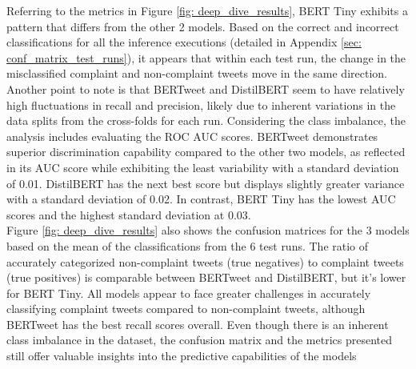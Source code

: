 Referring to the metrics in Figure \ref{fig: deep_dive_results}, BERT Tiny exhibits a pattern that differs from the other 2 models. Based on the correct and incorrect classifications for all the inference executions (detailed in Appendix \ref{sec: conf_matrix_test_runs}), it appears that within each test run, the change in the misclassified complaint and non-complaint tweets move in the same direction. Another point to note is that BERTweet and DistilBERT seem to have relatively high fluctuations in recall and precision, likely due to inherent variations in the data splits from the cross-folds for each run. Considering the class imbalance, the analysis includes evaluating the ROC AUC scores. BERTweet demonstrates superior discrimination capability compared to the other two models, as reflected in its AUC score while exhibiting the least variability with a standard deviation of 0.01. DistilBERT has the next best score but displays slightly greater variance with a standard deviation of 0.02. In contrast, BERT Tiny has the lowest AUC scores and the highest standard deviation at 0.03.\\

Figure \ref{fig: deep_dive_results} also shows the confusion matrices for the 3 models based on the mean of the classifications from the 6 test runs. The ratio of accurately categorized non-complaint tweets (true negatives) to complaint tweets (true positives) is comparable between BERTweet and DistilBERT, but it's lower for BERT Tiny. All models appear to face greater challenges in accurately classifying complaint tweets compared to non-complaint tweets, although BERTweet has the best recall scores overall. Even though there is an inherent class imbalance in the dataset, the confusion matrix and the metrics presented still offer valuable insights into the predictive capabilities of the models\\

